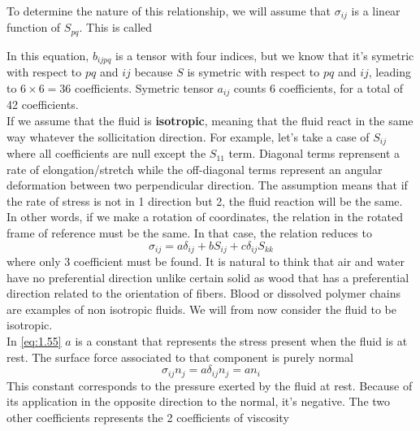 	  To determine the nature of this relationship, we will assume that $\sigma _{ij} $ is a linear function of $S_{pq}$. This is called 
	\begin{center}	  
	  \end{center}
	  In this equation, $b_{ijpq}$ is a tensor with four indices, but we know that it's symetric with respect to $pq$ and $ij$ because $S$ is symetric with respect to $pq$ and $ij$, leading to $6 \times 6 = 36$ coefficients. Symetric tensor $a_{ij}$ counts 6 coefficients, for a total of 42 coefficients. \\
	  If we assume that the fluid is \textbf{isotropic}, meaning that the fluid react in the same way whatever the sollicitation direction. For example, let's take a case of $S_{ij}$ where all coefficients are null except the $S_{11}$ term. Diagonal terms reprensent a rate of elongation/stretch while the off-diagonal terms represent an angular deformation between two perpendicular direction. The assumption means that if the rate of stress is not in 1 direction but 2, the fluid reaction will be the same. In other words, if we make a rotation of coordinates, the relation in the rotated frame of reference must be the same. In that case, the relation reduces to
	  \begin{equation}
	  	\sigma _{ij} = a \delta _{ij} + bS _{ij} + c \delta _{ij}S_{kk}
	  	\label{eq:1.55}
	  \end{equation}
	  where only 3 coefficient must be found. It is natural to think that air and water have no preferential direction unlike certain solid as wood that has a preferential direction related to the orientation of fibers. Blood or dissolved polymer chains are examples of non isotropic fluids. We will from now consider the fluid to be isotropic. \\
In \eqref{eq:1.55} $a$ is a constant that represents the stress present when the fluid is at rest. 	The surface force associated to that component is purely normal 
		\begin{equation}
			\sigma _{ij} n_j = a \delta _{ij} n_j = an_i
		\end{equation}
		This constant corresponds to the pressure exerted by the fluid at rest. Because of its application in the opposite direction to the normal, it's negative. The two other coefficients represents the 2 coefficients of viscosity
